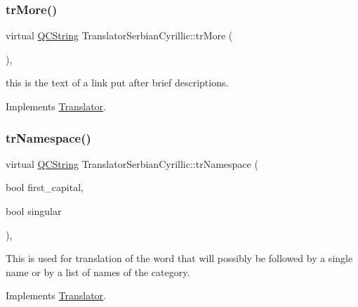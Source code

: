 \mbox{\label{class_translator_serbian_cyrillic_a93da2b0552deac88efa773051690e57b}} 
\subsubsection{\texorpdfstring{trMore()}{trMore()}}
{\footnotesize\ttfamily virtual \mbox{\hyperlink{class_q_c_string}{Q\+C\+String}} Translator\+Serbian\+Cyrillic\+::tr\+More (\begin{DoxyParamCaption}{ }\end{DoxyParamCaption})\hspace{0.3cm}{\ttfamily [inline]}, {\ttfamily [virtual]}}

this is the text of a link put after brief descriptions. 

Implements \mbox{\hyperlink{class_translator}{Translator}}.

\mbox{\label{class_translator_serbian_cyrillic_a4cdb3dde664df2215ece9b5e2a16765a}} 
\subsubsection{\texorpdfstring{trNamespace()}{trNamespace()}}
{\footnotesize\ttfamily virtual \mbox{\hyperlink{class_q_c_string}{Q\+C\+String}} Translator\+Serbian\+Cyrillic\+::tr\+Namespace (\begin{DoxyParamCaption}\item[{bool}]{first\+\_\+capital,  }\item[{bool}]{singular }\end{DoxyParamCaption})\hspace{0.3cm}{\ttfamily [inline]}, {\ttfamily [virtual]}}

This is used for translation of the word that will possibly be followed by a single name or by a list of names of the category. 

Implements \mbox{\hyperlink{class_translator}{Translator}}.

\mbox{\label{class_translator_serbian_cyrillic_a63a41233fd8d4e57d2b4342321daca09}} 
